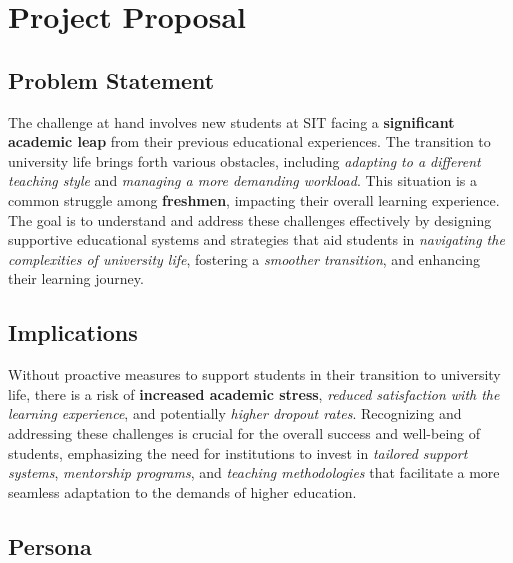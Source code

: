 \chapter{Project Proposal}\label{project_proposal}

\section{Problem Statement}\label{problem_statement}
The challenge at hand involves new students at SIT facing a \textbf{significant academic leap} from their previous educational experiences. The transition to university life brings forth various obstacles, including \textit{adapting to a different teaching style} and \textit{managing a more demanding workload}. This situation is a common struggle among \textbf{freshmen}, impacting their overall learning experience. The goal is to understand and address these challenges effectively by designing supportive educational systems and strategies that aid students in \textit{navigating the complexities of university life}, fostering a \textit{smoother transition}, and enhancing their learning journey.

\section{Implications}\label{implications}
Without proactive measures to support students in their transition to university life, there is a risk of \textbf{increased academic stress}, \textit{reduced satisfaction with the learning experience}, and potentially \textit{higher dropout rates}. Recognizing and addressing these challenges is crucial for the overall success and well-being of students, emphasizing the need for institutions to invest in \textit{tailored support systems}, \textit{mentorship programs}, and \textit{teaching methodologies} that facilitate a more seamless adaptation to the demands of higher education.
 
\section{Persona}\label{persona}

